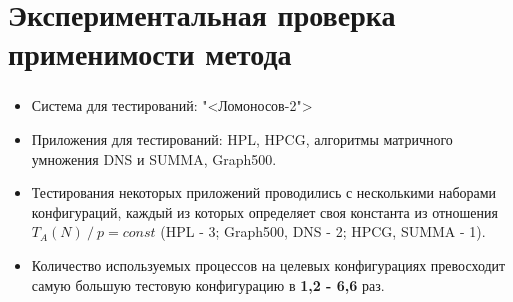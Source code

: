 \documentclass[unicode, t, 11pt]{beamer}%
\begin{document}
	\section{Экспериментальная проверка применимости метода}
		\begin{frame}
			\frametitle{\insertsection}
			\begin{itemize}[label = \(\bullet\)]

			\item Система для тестирований: "<Ломоносов-2">
			\item Приложения для тестирований: HPL, HPCG, алгоритмы матричного умножения DNS и SUMMA, Graph500.


			\item Тестирования некоторых приложений проводились с несколькими наборами конфигураций, каждый из которых определяет своя константа из отношения \(T_A(N)\:/\:p = const\) (HPL - 3; Graph500, DNS - 2; HPCG, SUMMA - 1).

			\item Количество используемых процессов на целевых конфигурациях превосходит самую большую тестовую конфигурацию в \textbf{1,2 - 6,6} раз.

			\end{itemize}
		\end{frame}
\end{document}
